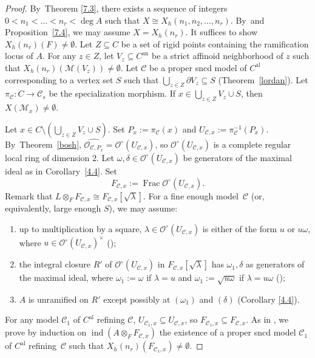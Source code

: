 \documentclass[JEP,XML,SOM,Unicode,NoFloatCountersInSection,published]{cedram}
\newenvironment{enumeratea}
{\bgroup\def\theenumi{\alph{enumi}}\begin{enumerate}}
{\end{enumerate}\egroup}
\newcommand{\al}{\mathrm{al}}
\DeclareMathOperator{\Frac}{Frac}
\DeclareMathOperator{\ind}{ind}
\let\backslash\setminus
\theoremstyle{definition}
\begin{document}
\begin{proof} By~Theorem \ref{7.3}, there exists a sequence of integers $0< n_1< \dots < n_r < \deg{A}$ such that $X \cong X_h(n_1, n_2, \dots, n_r)$. By~\loccit and Proposition~\ref{7.4}, we may assume $X=X_h(n_r)$. It suffices to show $X_h(n_r)(F) \neq \emptyset$.
Let $Z \subseteq C$ be a set of rigid points containing the ramification locus of $A$. For any $z \in Z$, let $V_z \subseteq C^{\mathrm{an}}$ be a strict affinoid neighborhood of $z$ such that $X_h(n_r)(\mathscr{M}(V_z)) \neq \emptyset$. Let $\mathscr{C}$ be a proper sncd model of $C^{\al}$ corresponding to a vertex set $S$ such that $\bigcup_{z \in Z} \partial{V_z} \subseteq S$ (Theorem~\ref{lordan}). Let $\pi_{\mathscr{C}}: C \to \mathscr{C}_s$ be the specialization morphism. If $x \in \bigcup_{z \in Z} V_z \cup S$, then $X(\mathscr{M}_x)\neq \emptyset$.

Let $x \in C \backslash (\bigcup_{z \in Z} V_z \cup S)$. Set $P_x:=\pi_{\mathscr{C}}(x)$ and $U_{\mathscr{C},x}:=\pi_{\mathscr{C}}^{-1}(P_x)$. By~Theorem~\ref{bosh}, $\widehat{\mathcal{O}_{\mathscr{C}, P_x}}=\mathcal{O}^{\circ}(U_{\mathscr{C},x})$, so $\mathcal{O}^{\circ}(U_{\mathscr{C},x})$ is a complete regular local ring of dimension $2$. Let $\omega, \delta \in \mathcal{O}^{\circ}(U_{\mathscr{C},x})$ be generators of the maximal ideal as in Corollary~\ref{4.4}. Set
\[
F_{\mathscr{C},x}:=\Frac \mathcal{O}^{\circ}(U_{\mathscr{C},x}).
\]
Remark that $L \otimes_F F_{\mathscr{C},x} \cong F_{\mathscr{C},x}[\sqrt{\lambda}]$. For a fine enough model~$\mathscr{C}$ (or, equivalently, large enough $S$), we may assume:
\begin{enumeratea}
\item\label{enum:a}
up to multiplication by a square, $\lambda \in \mathcal{O}^{\circ}(U_{\mathscr{C},x})$ is either of the form $u$ or $u \omega$, where $u \in \mathcal{O}^{\circ}(U_{\mathscr{C},x})^{\times}$ (\cf \cite[Lem.\,4.2]{wu});
\item\label{enum:b}
the integral closure $R'$ of $\mathcal{O}^{\circ}(U_{\mathscr{C},x})$ in $F_{\mathscr{C},x}[\sqrt{\lambda}]$ has $\omega_1, \delta$ as generators of the maximal ideal, where $\omega_1:=\omega$ if $\lambda=u$ and $\omega_1:=\sqrt{u \omega}$ if $\lambda=u\omega$ (\cf \cite[\S 9]{parsur});
\item\label{enum:c}
$A$ is unramified on $R'$ except possibly at $(\omega_1)$ and $(\delta)$ (Corollary \ref{4.4}).
\end{enumeratea}
For any model $\mathscr{C}_1$ of $C^{\al}$ refining $\mathscr{C}$, $U_{{\mathscr{C}_1,x}} \subseteq U_{\mathscr{C},x}$, so $F_{\mathscr{C}_1,x} \subseteq F_{\mathscr{C},x}$.
As in \cite[Th.\,12.2]{parsur}, we prove by induction on $\ind(A \otimes_F F_{\mathscr{C},x})$ the existence of a proper sncd model $\mathscr{C}_1$ of $C^{\al}$ refining~$\mathscr{C}$ such that $X_h(n_r)(F_{\mathscr{C}_1,x}) \neq \emptyset$.


\end{proof}
\end{document}
